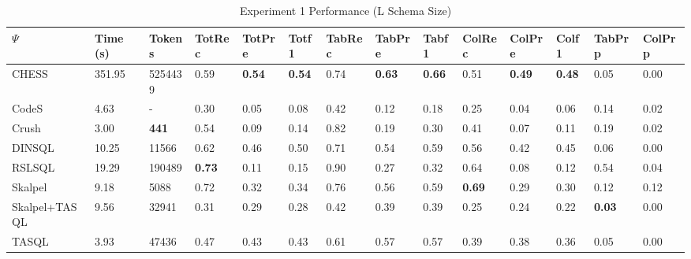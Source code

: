 \begin{table*}
\caption{Experiment 1 Performance (L Schema Size)}
\label{tab:exp1-l-schema}
\begin{tabular}{llllllllllllll}
\toprule
$\Psi$ & Time (s) & Tokens & TotRec & TotPre & Totf1 & TabRec & TabPre & Tabf1 & ColRec & ColPre & Colf1 & TabPrp & ColPrp \\
\midrule
CHESS & 351.95 & 5254439 & 0.59 & \textbf{0.54} & \textbf{0.54} & 0.74 & \textbf{0.63} & \textbf{0.66} & 0.51 & \textbf{0.49} & \textbf{0.48} & 0.05 & 0.00 \\
CodeS & 4.63 & - & 0.30 & 0.05 & 0.08 & 0.42 & 0.12 & 0.18 & 0.25 & 0.04 & 0.06 & 0.14 & 0.02 \\
Crush & 3.00 & \textbf{441} & 0.54 & 0.09 & 0.14 & 0.82 & 0.19 & 0.30 & 0.41 & 0.07 & 0.11 & 0.19 & 0.02 \\
DINSQL & 10.25 & 11566 & 0.62 & 0.46 & 0.50 & 0.71 & 0.54 & 0.59 & 0.56 & 0.42 & 0.45 & 0.06 & 0.00 \\
RSLSQL & 19.29 & 190489 & \textbf{0.73} & 0.11 & 0.15 & 0.90 & 0.27 & 0.32 & 0.64 & 0.08 & 0.12 & 0.54 & 0.04 \\
Skalpel & 9.18 & 5088 & 0.72 & 0.32 & 0.34 & 0.76 & 0.56 & 0.59 & \textbf{0.69} & 0.29 & 0.30 & 0.12 & 0.12 \\
Skalpel+TASQL & 9.56 & 32941 & 0.31 & 0.29 & 0.28 & 0.42 & 0.39 & 0.39 & 0.25 & 0.24 & 0.22 & \textbf{0.03} & 0.00 \\
TASQL & 3.93 & 47436 & 0.47 & 0.43 & 0.43 & 0.61 & 0.57 & 0.57 & 0.39 & 0.38 & 0.36 & 0.05 & 0.00 \\
\bottomrule
\end{tabular}
\end{table*}
